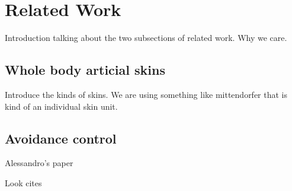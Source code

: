\chapter{Related Work}
\label{relworkchap}


Introduction talking about the two subsections of related work. Why we care.

\section{Whole body articial skins}

Introduce the kinds of skins. We are using something like mittendorfer that is kind of an individual skin unit.








\section{Avoidance control}



Alessandro's paper

Look cites
